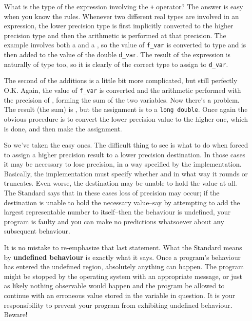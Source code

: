   What is the type of the expression involving the \texttt{+} operator?
   The answer is easy when you know the rules. Whenever two different real
   types are involved in an expression, the lower precision type is first
   implicitly converted to the higher precision type and then the arithmetic
   is performed at that precision. The example involves both a
   \double{} and a \float, so the value of
   \texttt{f\_var} is converted to type \double{} and is then
   added to the value of the double \texttt{d\_var}. The result of the
   expression is naturally of type \double{} too, so it is clearly
   of the correct type to assign to \texttt{d\_var}.


  The second of the additions is a little bit more complicated, but still
   perfectly O.K. Again, the value of \texttt{f\_var} is converted and the
   arithmetic performed with the precision of \double, forming the
   sum of the two variables. Now there's a problem. The result (the sum) is
   \double, but the assignment is to a \texttt{long double}.
   Once again the obvious procedure is to convert the lower precision value to
   the higher one, which is done, and then make the assignment.


  So we've taken the easy ones. The difficult thing to see is what to do
   when forced to assign a higher precision result to a lower precision
   destination. In those cases it may be necessary to lose precision, in a way
   specified by the implementation. Basically, the implementation must specify
   whether and in what way it rounds or truncates. Even worse, the destination
   may be unable to hold the value at all. The Standard says that in these
   cases loss of precision may occur; if the destination is unable to hold the
   necessary value--say by attempting to add the largest representable
   number to itself--then the behaviour is undefined, your program is
   faulty and you can make no predictions whatsoever about any subsequent
   behaviour.


  It is no mistake to re-emphasize that last statement. What the Standard
   means by \textbf{undefined behaviour} is exactly what it says. Once a
   program's behaviour has entered the undefined region, absolutely anything
   can happen. The program might be stopped by the operating system with an
   appropriate message, or just as likely nothing observable would happen and
   the program be allowed to continue with an erroneous value stored in the
   variable in question. It is your responsibility to prevent your program
   from exhibiting undefined behaviour. Beware!


